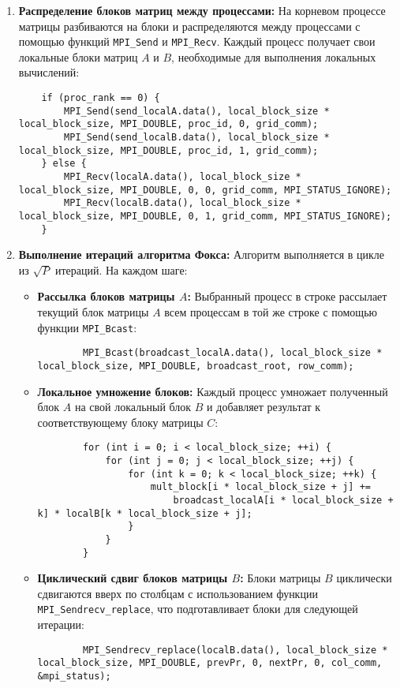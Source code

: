 \documentclass{report}
\begin{document}
\begin{enumerate}
    \item \textbf{Распределение блоков матриц между процессами:}  
    На корневом процессе матрицы разбиваются на блоки и распределяются между процессами с помощью функций \texttt{MPI\_Send} и \texttt{MPI\_Recv}. Каждый процесс получает свои локальные блоки матриц $A$ и $B$, необходимые для выполнения локальных вычислений:
    \begin{lstlisting}
    if (proc_rank == 0) {
        MPI_Send(send_localA.data(), local_block_size * local_block_size, MPI_DOUBLE, proc_id, 0, grid_comm);
        MPI_Send(send_localB.data(), local_block_size * local_block_size, MPI_DOUBLE, proc_id, 1, grid_comm);
    } else {
        MPI_Recv(localA.data(), local_block_size * local_block_size, MPI_DOUBLE, 0, 0, grid_comm, MPI_STATUS_IGNORE);
        MPI_Recv(localB.data(), local_block_size * local_block_size, MPI_DOUBLE, 0, 1, grid_comm, MPI_STATUS_IGNORE);
    }
    \end{lstlisting}

    \item \textbf{Выполнение итераций алгоритма Фокса:}  
    Алгоритм выполняется в цикле из $\sqrt{P}$ итераций. На каждом шаге:
    \begin{itemize}
        \item \textbf{Рассылка блоков матрицы $A$:} Выбранный процесс в строке рассылает текущий блок матрицы $A$ всем процессам в той же строке с помощью функции \texttt{MPI\_Bcast}:
        \begin{lstlisting}
        MPI_Bcast(broadcast_localA.data(), local_block_size * local_block_size, MPI_DOUBLE, broadcast_root, row_comm);
        \end{lstlisting}

        \item \textbf{Локальное умножение блоков:} Каждый процесс умножает полученный блок $A$ на свой локальный блок $B$ и добавляет результат к соответствующему блоку матрицы $C$:
        \begin{lstlisting}
        for (int i = 0; i < local_block_size; ++i) {
            for (int j = 0; j < local_block_size; ++j) {
                for (int k = 0; k < local_block_size; ++k) {
                    mult_block[i * local_block_size + j] +=
                        broadcast_localA[i * local_block_size + k] * localB[k * local_block_size + j];
                }
            }
        }
        \end{lstlisting}

        \item \textbf{Циклический сдвиг блоков матрицы $B$:} Блоки матрицы $B$ циклически сдвигаются вверх по столбцам с использованием функции \texttt{MPI\_Sendrecv\_replace}, что подготавливает блоки для следующей итерации:
        \begin{lstlisting}
        MPI_Sendrecv_replace(localB.data(), local_block_size * local_block_size, MPI_DOUBLE, prevPr, 0, nextPr, 0, col_comm, &mpi_status);
        \end{lstlisting}
    \end{itemize}


\end{enumerate}
\end{document}
